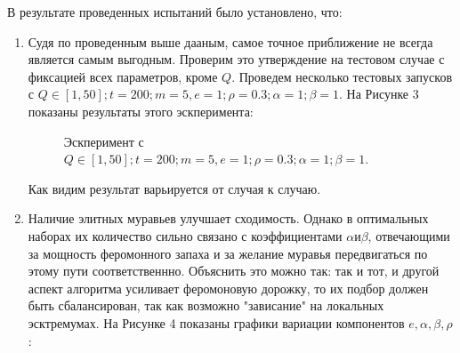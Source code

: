 \documentclass[a4paper, 12pt]{article}
\begin{document}
	\clearpage
	\newpage
	В результате проведенных испытаний было установлено, что:\\
	\begin{enumerate}
		\item Судя по проведенным выше дааным, самое точное приближение не всегда является самым выгодным. Проверим это утверждение на тестовом случае с фиксацией всех параметров, кроме $Q$. Проведем несколько тестовых запусков с $Q \in [1, 50]; t = 200; m = 5, e = 1; \rho = 0.3; \alpha = 1; \beta = 1.$ На Рисунке 3 показаны результаты этого эскперимента:\\
		\begin{figure}[h!]
			\caption{Эскперимент с $Q \in [1, 50]; t = 200; m = 5, e = 1; \rho = 0.3; \alpha = 1; \beta = 1.$}
		\end{figure}
		Как видим результат варьируется от случая к случаю.
		\item Наличие элитных муравьев улучшает сходимость. Однако в оптимальных наборах их количество сильно связано с коэффициентами $\alpha и \beta$, отвечающими за мощность феромонного запаха и за желание муравья передвигаться по этому пути соответственнно. Объяснить это можно так: так и тот, и другой аспект алгоритма усиливает феромоновую дорожку, то их подбор должен быть сбалансирован, так как возможно "зависание" на локальных эсктремумах. На Рисунке 4 показаны графики вариации компонентов $e, \alpha, \beta, \rho$:
		\clearpage
		\newpage
		\begin{figure}[h]

\end{figure}
\end{enumerate}
\end{document}
